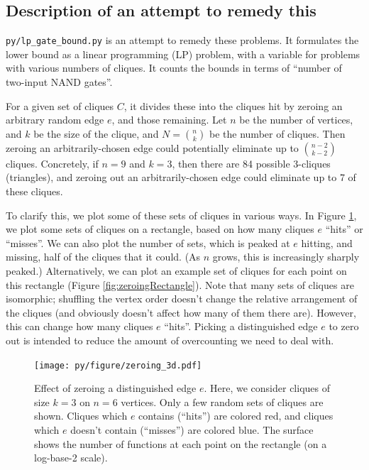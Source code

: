\documentclass[12pt]{article}
\theoremstyle{definition}
\begin{document}
\subsection{Description of an attempt to remedy this}

{\tt py/lp\_gate\_bound.py} is an attempt to remedy these problems.
It formulates the lower bound as a linear programming (LP) problem,
with a variable for problems with various numbers of cliques.
It counts the bounds in terms of ``number of two-input NAND gates''.

For a given set of cliques $C$, it divides these into the cliques
hit by zeroing an arbitrary random edge $e$, and those remaining.
Let $n$ be the number of vertices, and $k$ be the size of the clique,
and $N = {n \choose k}$ be the number of cliques. Then zeroing
an arbitrarily-chosen edge could potentially eliminate up to
${n-2 \choose k-2}$ cliques.
Concretely, if $n=9$ and $k=3$, then there are 84 possible 3-cliques
(triangles), and zeroing out an arbitrarily-chosen edge could
eliminate up to 7 of these cliques.

To clarify this, we plot some of these sets of cliques in various ways.
In Figure \ref{fig:zeroing3D},
we plot some sets of cliques on a rectangle, based on how many cliques $e$ ``hits'' or ``misses''.
We can also plot the number of sets, which
is peaked at $e$ hitting, and missing, half of the cliques that it could.
(As $n$ grows, this is increasingly sharply peaked.)
Alternatively, we can plot an example set of cliques for each point on this rectangle
(Figure \ref{fig:zeroingRectangle}). Note that many sets of cliques are isomorphic;
shuffling the vertex order doesn't change the relative arrangement of the cliques
(and obviously doesn't affect how many of them there are). However, this can change
how many cliques $e$ ``hits''. Picking a distinguished edge $e$ to zero out
is intended to reduce the amount of overcounting we need to deal with.

\begin{figure}
\centering
\texttt{[image: py/figure/zeroing\_3d.pdf]}
\caption{Effect of zeroing a distinguished edge $e$.
Here, we consider cliques of size $k=3$ on $n=6$ vertices.
Only a few random sets of cliques are shown.
Cliques which $e$ contains (``hits'')
are colored red, and cliques which $e$ doesn't contain (``misses'')
are colored blue.
The surface shows the number of functions at each point
on the rectangle (on a log-base-2 scale).
}
\label{fig:zeroing3D}
\end{figure}
\end{document}
